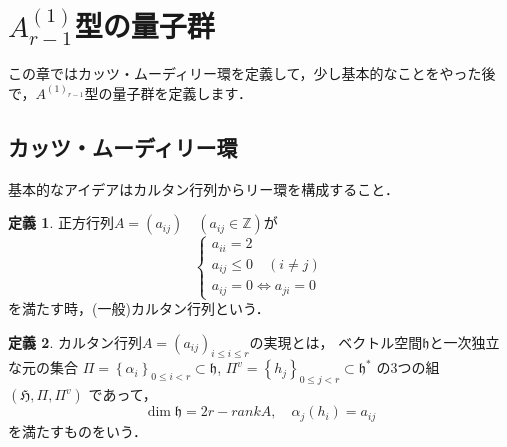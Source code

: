 \documentclass[dvipdfmx,autodetect-engine]{article}
\title{}
\author{}
\date{}
\theoremstyle{definition}
\newtheorem{Def}{定義}
\begin{document}
\section{$A^{(1)}_{r-1}$型の量子群}
    この章ではカッツ・ムーディリー環を定義して，少し基本的なことをやった後で，$A^{(1)_{r-1}}$型の量子群を定義します．
\subsection{カッツ・ムーディリー環}
    基本的なアイデアはカルタン行列からリー環を構成すること．
    \begin{Def}
        正方行列$A = (a_{ij}) \quad (a_{ij} \in \mathbb{Z})$が
        \[
            \begin{cases}
                a_{ii} = 2 \\
                a_{ij} \leq 0 \quad (i \neq j) \\
                a_{ij} = 0 \iff a_{ji} = 0
            \end{cases}
        \]
        を満たす時，(一般)カルタン行列という．
    \end{Def}
    
    \begin{Def}
        カルタン行列$A = (a_{ij})_{i \leq i \leq r}$の実現とは，
        ベクトル空間$\mathfrak{h}$と一次独立な元の集合
        $\Pi=\left\{\alpha_{i}\right\}_{0 \leq i<r} \subset \mathfrak{h}$, 
        $\Pi^{v}=\left\{h_{j}\right\}_{0 \leq j<r} \subset \mathfrak{h}^{*}$
        の3つの組$(\mathfrak{H}, \Pi, \Pi^{v})$
        であって，
        \[
            \dim\mathfrak{h} = 2r - rankA,\quad \alpha_j(h_i) = a_{ij}
        \]
        を満たすものをいう．
    \end{Def}
    
    
 
\end{document}
